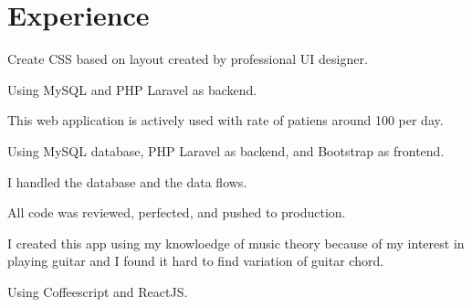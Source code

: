 \documentclass[letterpaper]{deedy-resume} %
\begin{document}
\hfill
%
%
\begin{minipage}[t]{0.66\textwidth} %


\section{Experience}


\vspace{\topsep} %
\begin{tightitemize}
\item Create CSS based on layout created by professional UI designer.
\item Using MySQL and PHP Laravel as backend.
\end{tightitemize}
\sectionspace



\begin{tightitemize}
\item This web application is actively used with rate of patiens around 100 per day.
\item Using MySQL database, PHP Laravel as backend, and Bootstrap as frontend.
\item I handled the database and the data flows.
\item All code was reviewed, perfected, and pushed to production.
\end{tightitemize}
\sectionspace



\begin{tightitemize}
\item I created this app using my knowloedge of music theory because of my interest in playing guitar and I found it hard to find variation of guitar chord.
\item Using Coffeescript and ReactJS.
\end{tightitemize}
\sectionspace


\end{minipage}
\end{document}
